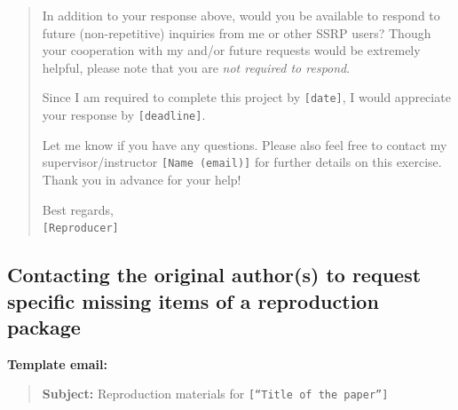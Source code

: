 \documentclass[]{book}
\begin{document}
\begin{quote}
In addition to your response above, would you be available to respond to future (non-repetitive) inquiries from me or other SSRP users? Though your cooperation with my and/or future requests would be extremely helpful, please note that you are \emph{not required to respond}.

Since I am required to complete this project by \texttt{{[}date{]}}, I would appreciate your response by \texttt{{[}deadline{]}}.

Let me know if you have any questions. Please also feel free to contact my supervisor/instructor \texttt{{[}Name\ (email){]}} for further details on this exercise. Thank you in advance for your help!

Best regards,\\
\texttt{{[}Reproducer{]}}
\end{quote}

\hypertarget{contacting-the-original-authors-to-request-specific-missing-items-of-a-reproduction-package}{%
\subsection{Contacting the original author(s) to request specific missing items of a reproduction package}\label{contacting-the-original-authors-to-request-specific-missing-items-of-a-reproduction-package}}

\textbf{Template email:}

\begin{quote}
\textbf{Subject:} Reproduction materials for \texttt{{[}“Title\ of\ the\ paper”{]}}
\end{quote}
\end{document}
